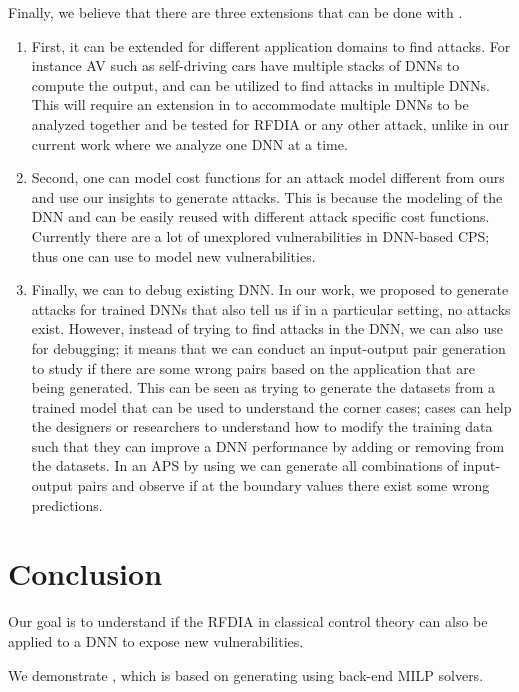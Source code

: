 Finally, we believe that there are three extensions that can be done with \tool. 
\begin{enumerate}
	\item First, it can be extended for different application domains to find attacks.
	For instance \ac{AV} such as self-driving cars have multiple stacks of \ac{DNN}s to compute the output, and \tool can be utilized to find attacks in multiple \ac{DNN}s. 
	This will require an extension in \tool to accommodate multiple \ac{DNN}s to be analyzed together and be tested for \ac{RFDIA} or any other attack, unlike in our current work where we analyze one \ac{DNN} at a time. 
	\item Second, one can model cost functions for an attack model different from ours and use our insights to generate attacks. 
	This is because the modeling of the \ac{DNN} and \tool can be easily reused with different attack specific cost functions. 
	Currently there are a lot of unexplored vulnerabilities in \ac{DNN}-based \ac*{CPS}; thus one can use \tool to model new vulnerabilities. 
	\item Finally, we can \tool to debug existing DNN.
	In our work, we proposed \tool to generate attacks for trained \ac{DNN}s that also tell us if in a particular setting, no attacks exist. 
	However, instead of trying to find attacks in the \ac{DNN}, we can also use \tool for debugging; it means that we can conduct an input-output pair generation to study if there are some wrong pairs based on the application that are being generated. 
	This can be seen as trying to generate the datasets from a trained model that can be used to understand the corner cases; cases can help the designers or researchers to understand how to modify the training data such that they can improve a \ac{DNN} performance by adding or removing from the datasets.
	In an \ac{APS} by using \tool we can generate all combinations of input-output pairs and observe if at the boundary values there exist some wrong predictions. 
\end{enumerate}


\section{Conclusion}


Our goal is to understand if the  \ac*{RFDIA} in classical control theory can also be applied to a \ac{DNN} to expose new vulnerabilities.

We demonstrate \tool, which is based on generating \attack using back-end \ac{MILP} solvers. 

